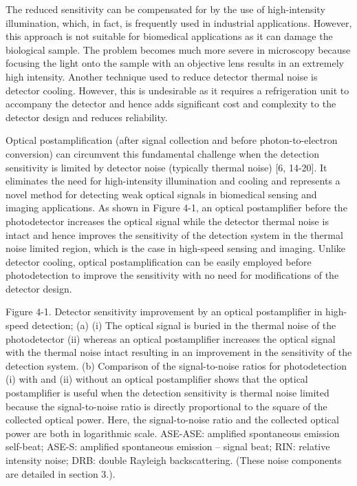 The reduced sensitivity can be compensated for by the use of high-intensity illumination, which, in fact, is frequently used in industrial applications. However, this approach is not suitable for biomedical applications as it can damage the biological sample. The problem becomes much more severe in microscopy because focusing the light onto the sample with an objective lens results in an extremely high intensity. Another technique used to reduce detector thermal noise is detector cooling. However, this is undesirable as it requires a refrigeration unit to accompany the detector and hence adds significant cost and complexity to the detector design and reduces reliability.

Optical postamplification (after signal collection and before photon-to-electron conversion) can circumvent this fundamental challenge when the detection sensitivity is limited by detector noise (typically thermal noise) [6, 14-20]. It eliminates the need for high-intensity illumination and cooling and represents a novel method for detecting weak optical signals in biomedical sensing and imaging applications. As shown in Figure 4-1, an optical postamplifier before the photodetector increases the optical signal while the detector thermal noise is intact and hence improves the sensitivity of the detection system in the thermal noise limited region, which is the case in high-speed sensing and imaging. Unlike detector cooling, optical postamplification can be easily employed before photodetection to improve the sensitivity with no need for modifications of the detector design. 

Figure 4-1. Detector sensitivity improvement by an optical postamplifier in high-speed detection; (a) (i) The optical signal is buried in the thermal noise of the photodetector (ii) whereas an optical postamplifier increases the optical signal with the thermal noise intact resulting in an improvement in the sensitivity of the detection system. (b) Comparison of the signal-to-noise ratios for photodetection (i) with and (ii) without an optical postamplifier shows that the optical postamplifier is useful when the detection sensitivity is thermal noise limited because the signal-to-noise ratio is directly proportional to the square of the collected optical power. Here, the signal-to-noise ratio and the collected optical power are both in logarithmic scale. ASE-ASE: amplified spontaneous emission self-beat; ASE-S: amplified spontaneous emission – signal beat; RIN: relative intensity noise; DRB: double Rayleigh backscattering. (These noise components are detailed in section 3.).

